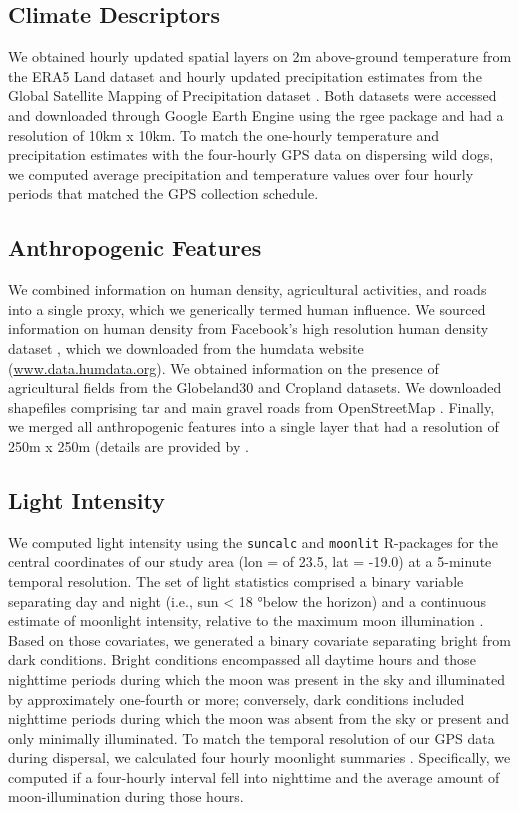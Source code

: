 \documentclass[abstract=on,10pt,a4paper,bibliography=totocnumbered]{article}
\begin{document}
\subsection{Climate Descriptors}

We obtained hourly updated spatial layers on 2m above-ground temperature from
the ERA5 Land dataset \citep{Munoz-Sabater.2021} and hourly updated precipitation
estimates from the Global Satellite Mapping of Precipitation dataset
\citep{Kubota.2020}. Both datasets were accessed and downloaded through Google
Earth Engine \citep{Gorelick.2017} using the rgee package \citep{Aybar.2024} and
had a resolution of 10km x 10km. To match the one-hourly temperature and
precipitation estimates with the four-hourly GPS data on dispersing wild dogs,
we computed average precipitation and temperature values over four hourly
periods that matched the GPS collection schedule.

\subsection{Anthropogenic Features}

We combined information on human density, agricultural activities, and roads
into a single proxy, which we generically termed human influence. We sourced
information on human density from Facebook’s high resolution human density
dataset \citep{Tiecke.2017}, which we downloaded from the humdata website
(\url{www.data.humdata.org}). We obtained information on the presence of
agricultural fields from the Globeland30 \citep{Chen.2015} and Cropland
\citep{Xiong.2017} datasets. We downloaded shapefiles comprising tar and main
gravel roads from OpenStreetMap \citep{OpenStreetMapContributors.2017}. Finally,
we merged all anthropogenic features into a single layer that had a resolution
of 250m x 250m (details are provided by \citealp{Hofmann.2021}.

\subsection{Light Intensity}

We computed light intensity using the \texttt{suncalc} and \texttt{moonlit}
R-packages \citep{Thieurmel.2022, Smielak.2023} for the central coordinates of
our study area (lon = of 23.5, lat = -19.0) at a 5-minute temporal resolution.
The set of light statistics comprised a binary variable separating day and night
(i.e., sun < 18 °below the horizon) and a continuous estimate of moonlight
intensity, relative to the maximum moon illumination . Based on
those covariates, we generated a binary covariate separating bright from dark
conditions. Bright conditions encompassed all daytime hours and those nighttime
periods during which the moon was present in the sky and illuminated by
approximately one-fourth or more; conversely, dark conditions included nighttime
periods during which the moon was absent from the sky or present and only
minimally illuminated. To match the temporal resolution of our GPS data during
dispersal, we calculated four hourly moonlight summaries .
Specifically, we computed if a four-hourly interval fell into nighttime and the
average amount of moon-illumination during those hours.
\end{document}
